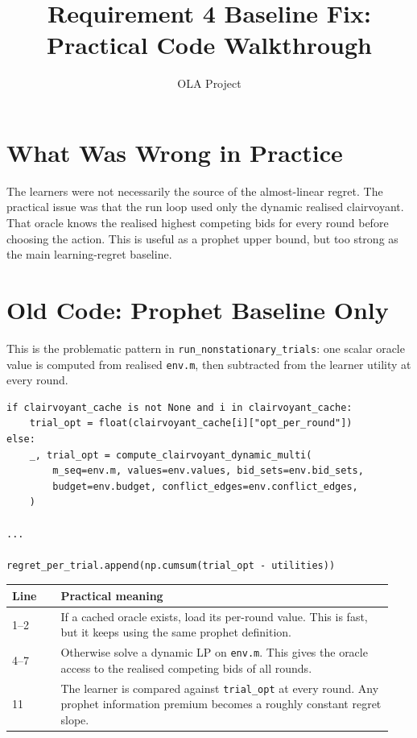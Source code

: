 \documentclass[10pt,a4paper]{article}
\title{\vspace{-1.1em}\textbf{Requirement 4 Baseline Fix: Practical Code Walkthrough}}
\author{OLA Project}
\date{}
\begin{document}
\maketitle
\vspace{-1.5em}

\section{What Was Wrong in Practice}
The learners were not necessarily the source of the almost-linear regret. The practical issue was that the run loop used only the dynamic realised clairvoyant. That oracle knows the realised highest competing bids for every round before choosing the action. This is useful as a prophet upper bound, but too strong as the main learning-regret baseline.

\section{Old Code: Prophet Baseline Only}
This is the problematic pattern in \texttt{run\_nonstationary\_trials}: one scalar oracle value is computed from realised \texttt{env.m}, then subtracted from the learner utility at every round.

\begin{lstlisting}[style=badpython]
if clairvoyant_cache is not None and i in clairvoyant_cache:
    trial_opt = float(clairvoyant_cache[i]["opt_per_round"])
else:
    _, trial_opt = compute_clairvoyant_dynamic_multi(
        m_seq=env.m, values=env.values, bid_sets=env.bid_sets,
        budget=env.budget, conflict_edges=env.conflict_edges,
    )

...

regret_per_trial.append(np.cumsum(trial_opt - utilities))
\end{lstlisting}

\begin{tabular}{@{}p{0.12\linewidth}p{0.82\linewidth}@{}}
\toprule
Line & Practical meaning \\
\midrule
1--2 & If a cached oracle exists, load its per-round value. This is fast, but it keeps using the same prophet definition. \\
4--7 & Otherwise solve a dynamic LP on \texttt{env.m}. This gives the oracle access to the realised competing bids of all rounds. \\
11 & The learner is compared against \texttt{trial\_opt} at every round. Any prophet information premium becomes a roughly constant regret slope. \\
\bottomrule
\end{tabular}
\end{document}
